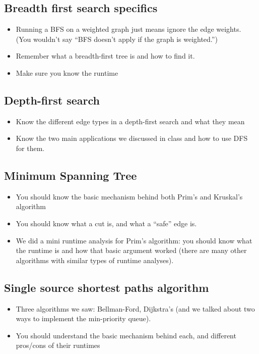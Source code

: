 \documentclass[11  pt]{exam}
\begin{document}
	\subsection{Breadth first search specifics}

	\begin{itemize}	
		\item Running a BFS on a weighted graph just means ignore the edge weights. (You wouldn't say ``BFS doesn't apply if the graph is weighted.'')
		\item Remember what a breadth-first tree is and how to find it.
		\item Make sure you know the runtime
	\end{itemize}


	\subsection{Depth-first search}
		\begin{itemize}	
			\item Know the different edge types in a depth-first search and what they mean
			\item Know the two main applications we discussed in class and how to use DFS for them.
		\end{itemize}

	\subsection{Minimum Spanning Tree}
\begin{itemize}	
	\item You should know the basic mechanism behind both Prim's and Kruskal's algorithm
	\item You should know what a cut is, and what a ``safe'' edge is.
	\item We did a mini runtime analysis for Prim's algorithm: you should know what the runtime is and how that basic argument worked (there are many other algorithms with similar types of runtime analyses).
\end{itemize}

	\subsection{Single source shortest paths algorithm}

\begin{itemize}	
	\item Three algorithms we saw: Bellman-Ford, Dijkstra's (and we talked about two ways to implement the min-priority queue).
	\item You should understand the basic mechanism behind each, and different pros/cons of their runtimes
\end{itemize}
\end{document}
